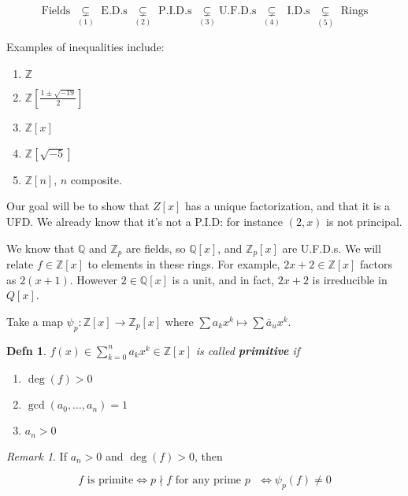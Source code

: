 \documentclass[12pt]{article}
\def\Z{{\mathbb Z}}
\def\Q{{\mathbb Q}}
\newtheorem{definition}{Defn}
\theoremstyle{remark}
\theoremstyle{remark}
\theoremstyle{remark}
\theoremstyle{remark}
\newtheorem*{remark}{Remark}
\theoremstyle{remark}
\begin{document}
\[
  \text{Fields } \underset{(1)}{\subsetneq} \text{ E.D.s }
  \underset{(2)}{\subsetneq} \text{ P.I.D.s } \underset{(3)}{\subsetneq} \text{
  U.F.D.s } \underset{(4)}{\subsetneq} \text{ I.D.s } \underset{(5)}{\subsetneq}
  \text{ Rings}
\]

Examples of inequalities include:
\begin{enumerate}[label=(\arabic*)]
  \item $\Z$
  \item $\Z[\frac{1 \pm \sqrt{-19}}{2}]$
  \item $\Z[x]$
  \item $\Z[\sqrt{-5}]$
  \item $\Z[n]$, $n$ composite.
\end{enumerate}

Our goal will be to show that $Z[x]$ has a unique factorization, and that it is
a UFD. We already know that it's not a P.I.D: for instance $(2, x)$ is not
principal.

We know that $\Q$ and $\Z_p$ are fields, so $\Q[x]$, and $\Z_p[x]$ are U.F.D.s.
We will relate $f \in \Z[x]$ to elements in these rings. For example, $2x + 2
\in \Z[x]$ factors as $2 (x + 1)$. However $2 \in \Q[x]$ is a unit, and in fact,
$2x + 2$ is irreducible in $Q[x]$.

Take a map $\psi_p: \Z[x] \to \Z_p[x]$ where $\sum a_k x^k \mapsto \sum \bar a_u
x^k$.

\begin{definition}
  $f(x) \in \sum_{k = 0}^n a_k x^k \in \Z[x]$ is called {\bf primitive} if

  \begin{enumerate}
    \item $\deg(f) > 0$
    \item $\gcd(a_0, \dots, a_n) = 1$
    \item $a_n > 0$
  \end{enumerate}
\end{definition}

\begin{remark}
  If $a_n > 0$ and $\deg(f) > 0$, then

  \[
    f \text{ is primite} \Leftrightarrow p \nmid f \text{ for any prime $p$ } \Leftrightarrow \psi_p(f) \ne 0
  \]
\end{remark}
\end{document}
